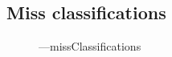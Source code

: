 \documentclass[11pt]{article}
\begin{document}
\subsection{Miss classifications}
\begin{figure}[H]
    \centering
    ---missClassifications
\end{figure}
\end{document}
